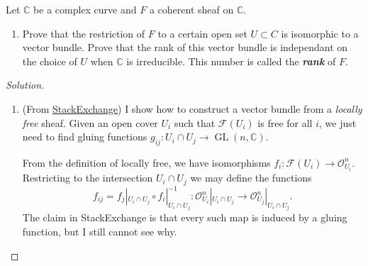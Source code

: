 \begin{manualexercise}{1.8}
	Let $\mathbb{C}$ be a complex curve and $F$ a coherent sheaf on $\mathbb{C}$.
	\begin{enumerate}[label=\alph*.]
		\item Prove that the restriction of $F$ to a certain open set $U\subset C$ is isomorphic to a vector bundle. Prove that the rank of this vector bundle is independant on the choice of $U$ when $\mathbb{C}$ is irreducible. This number is called the \textit{\textbf{rank}} of $F$.
	\end{enumerate}	
\end{manualexercise}

\begin{proof}[Solution]\leavevmode
	\begin{enumerate}[label=\alph*.]
		\item (From \href{https://math.stackexchange.com/questions/2725664/vector-bundle-locally-free-sheaf}{StackExchange}) I show how to construct a vector bundle from a \textit{locally free} sheaf. Given an open cover $U_i$ such that $\mathcal{F}(U_i)$ is free for all $i$, we just need to find gluing functions $g_{ij}:U_i\cap U_j\to \operatorname{GL}(n,\mathbb{C}) $.

		From the definition of locally free, we have isomorphisms $f_i:\mathcal{F}(U_i)\to \mathcal{O}^n_{U_i}$. Restricting to the intersection $U_i\cap U_j$ we may define the functions
	\[f_{ij}=f_j|_{U_i\cap U_j}\circ f_i|_{U_i\cap U_j}^{-1} :\mathcal{O}^n_{U_i}|_{U_i\cap U_j}\to \mathcal{O}^n_{U_j}|_{U_i\cap U_j}.\]
	The claim in StackExchange is that every such map is induced by a gluing function, but I still cannot see why.

	\iffalse\begin{remark}
		(\href{https://math.stackexchange.com/questions/2597356/vector-bundle-associated-to-a-locally-free-sheaf}{StackExchange}) The equivalence of the categories of vector bundles and locally free sheaves is given by the functor
		\[\mathcal{E}\mapsto \operatorname{Spec}(\operatorname{Sym}(\mathcal{E})),\quad E\mapsto \Gamma^\vee_{E/X^\bullet}\]
	\end{remark}\fi
	\end{enumerate}
\end{proof}


